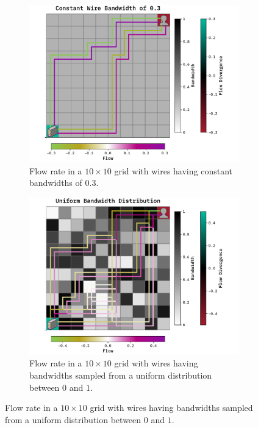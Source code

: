 \documentclass[10pt, titlepage, a4paper]{article}
\begin{document}
\begin{figure}[H]
    \centering
    \begin{subfigure}[t]{0.45\textwidth}
        \includegraphics[width=\textwidth]{../Images/arbitrary-2-constant-sub.pdf}
        \caption{Flow rate in a $10\times 10$ grid with wires having constant bandwidths of $0.3$.}
        \label{fig:ar2-const-sub}
    \end{subfigure}\hspace{1.0cm}
    \begin{subfigure}[t]{0.45\textwidth}
        \includegraphics[width=\textwidth]{../Images/arbitrary-2-uniform.pdf}
        \caption{Flow rate in a $10\times 10$ grid with wires having bandwidths sampled from a uniform distribution between $0$ and $1$.}
        \label{fig:ar2-uniform}
    \end{subfigure}
\end{figure}
\end{document}
